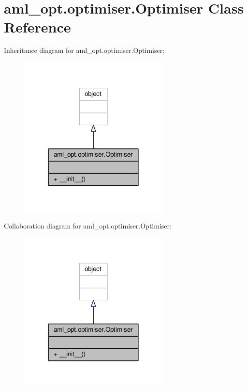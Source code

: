 \hypertarget{classaml__opt_1_1optimiser_1_1_optimiser}{\section{aml\-\_\-opt.\-optimiser.\-Optimiser Class Reference}
\label{classaml__opt_1_1optimiser_1_1_optimiser}
}


Inheritance diagram for aml\-\_\-opt.\-optimiser.\-Optimiser\-:
\nopagebreak
\begin{figure}[H]
\begin{center}
\leavevmode
\includegraphics[width=218pt]{classaml__opt_1_1optimiser_1_1_optimiser__inherit__graph}
\end{center}
\end{figure}


Collaboration diagram for aml\-\_\-opt.\-optimiser.\-Optimiser\-:
\nopagebreak
\begin{figure}[H]
\begin{center}
\leavevmode
\includegraphics[width=218pt]{classaml__opt_1_1optimiser_1_1_optimiser__coll__graph}
\end{center}
\end{figure}
